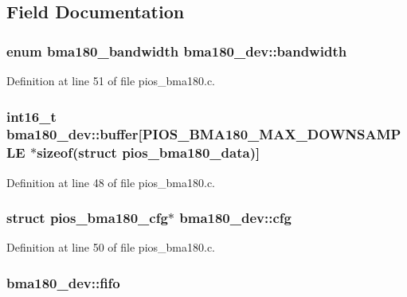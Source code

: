 \subsection{\-Field \-Documentation}
\hypertarget{structbma180__dev_ac532f2e8a6bae6b073f5491851d59293}{
\subsubsection[{bandwidth}]{\setlength{\rightskip}{0pt plus 5cm}enum {\bf bma180\-\_\-bandwidth} {\bf bma180\-\_\-dev\-::bandwidth}}}\label{structbma180__dev_ac532f2e8a6bae6b073f5491851d59293}


\-Definition at line 51 of file pios\-\_\-bma180.\-c.

\hypertarget{structbma180__dev_ab15069f2ae1a91840b59b781df64d014}{
\subsubsection[{buffer}]{\setlength{\rightskip}{0pt plus 5cm}int16\-\_\-t {\bf bma180\-\_\-dev\-::buffer}\mbox{[}\-P\-I\-O\-S\-\_\-\-B\-M\-A180\-\_\-\-M\-A\-X\-\_\-\-D\-O\-W\-N\-S\-A\-M\-P\-L\-E $\ast$sizeof(struct {\bf pios\-\_\-bma180\-\_\-data})\mbox{]}}}\label{structbma180__dev_ab15069f2ae1a91840b59b781df64d014}


\-Definition at line 48 of file pios\-\_\-bma180.\-c.

\hypertarget{structbma180__dev_ad7ed883d14d9f455e17d12157471501d}{
\subsubsection[{cfg}]{\setlength{\rightskip}{0pt plus 5cm}struct {\bf pios\-\_\-bma180\-\_\-cfg}$\ast$ {\bf bma180\-\_\-dev\-::cfg}}}\label{structbma180__dev_ad7ed883d14d9f455e17d12157471501d}


\-Definition at line 50 of file pios\-\_\-bma180.\-c.

\hypertarget{structbma180__dev_a5ea7560cd48ca5ad1fc285a2ff3084c8}{
\subsubsection[{fifo}]{ {\bf bma180\-\_\-dev\-::fifo}}}\label{structbma180__dev_a5ea7560cd48ca5ad1fc285a2ff3084c8}


